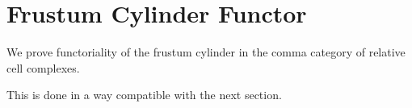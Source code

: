 \section{Frustum Cylinder Functor} \label{sec: frustrum cylinder functor}

We prove functoriality of the frustum cylinder in the comma category of relative cell complexes.

This is done in a way compatible with the next section.

